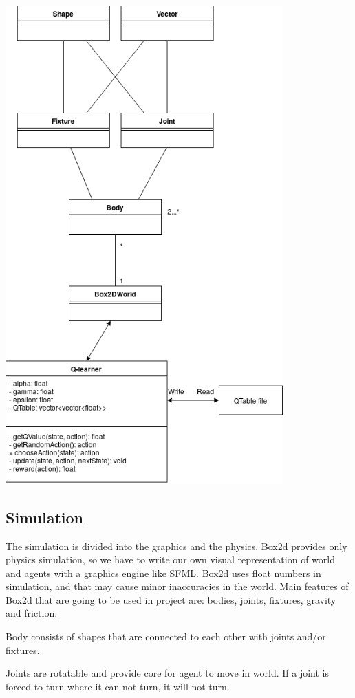 \documentclass{article}
\begin{document}
\includegraphics[width=0.8\textwidth]{UML}


\subsection{Simulation}
The simulation is divided into the graphics and the physics. Box2d provides only physics simulation,
so we have to write our own visual representation of world and agents with a graphics engine like SFML.
Box2d uses float numbers in simulation, and that may cause minor inaccuracies in the world.
Main features of Box2d that are going to be used in project are: bodies, joints, fixtures, gravity and friction.

Body consists of shapes that are connected to each other with joints and/or fixtures.

Joints are rotatable and provide core for agent to move in world. If a joint is
forced to turn where it can not turn, it will not turn.
\end{document}
